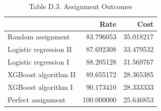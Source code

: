 \begin{table}
\caption{Table D.3. Assignment Outcomes}
\begin{tabular}{lrr}
\toprule
 & Rate & Cost \\
\midrule
Random assignment & 83.796053 & 35.018217 \\
Logistic regression II & 87.692308 & 33.479532 \\
Logistic regression I & 88.205128 & 31.569767 \\
XGBoost algorithm II & 89.655172 & 28.365385 \\
XGBoost algorithm I & 90.173410 & 28.333333 \\
Perfect assignment & 100.000000 & 25.646853 \\
\bottomrule
\end{tabular}
\end{table}
